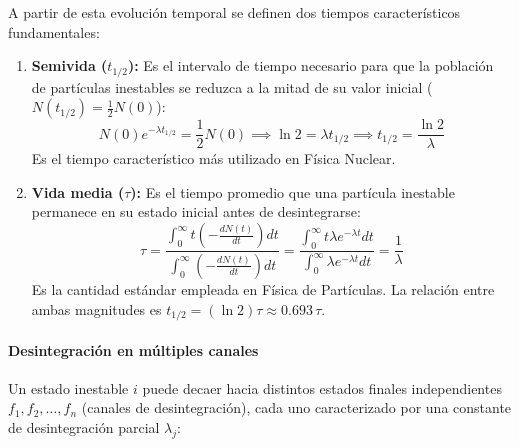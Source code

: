 A partir de esta evolución temporal se definen dos tiempos característicos fundamentales:

\begin{enumerate}[label=\alph*)]
    \item \textbf{Semivida ($t_{1/2}$):} Es el intervalo de tiempo necesario para que la población de partículas inestables se reduzca a la mitad de su valor inicial ($N(t_{1/2}) = \frac{1}{2}N(0)$):
    \begin{equation}
    N(0) e^{-\lambda t_{1/2}} = \frac{1}{2} N(0) \implies \ln 2 = \lambda t_{1/2} \implies t_{1/2} = \frac{\ln 2}{\lambda}
    \end{equation}
    Es el tiempo característico más utilizado en Física Nuclear.

    \item \textbf{Vida media ($\tau$):} Es el tiempo promedio que una partícula inestable permanece en su estado inicial antes de desintegrarse:
    \begin{equation}
    \tau = \frac{\int_0^\infty t \left(-\frac{dN(t)}{dt}\right) dt}{\int_0^\infty \left(-\frac{dN(t)}{dt}\right) dt} = \frac{\int_0^\infty t \lambda e^{-\lambda t} dt}{\int_0^\infty \lambda e^{-\lambda t} dt} = \frac{1}{\lambda}
    \end{equation}
    Es la cantidad estándar empleada en Física de Partículas. La relación entre ambas magnitudes es $t_{1/2} = (\ln 2)\tau \approx 0.693 \, \tau$.
\end{enumerate}

\paragraph{Desintegración en múltiples canales}

Un estado inestable $i$ puede decaer hacia distintos estados finales independientes $f_1, f_2, \dots, f_n$ (canales de desintegración), cada uno caracterizado por una constante de desintegración parcial $\lambda_j$:

\begin{center}
\end{center}

